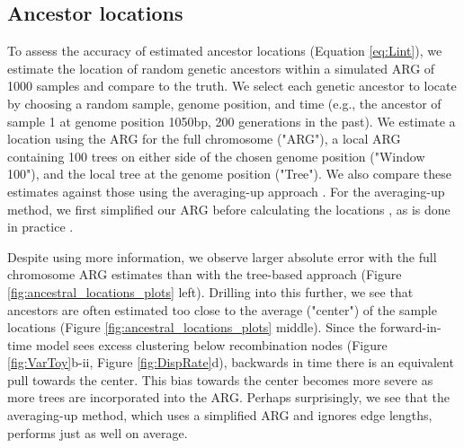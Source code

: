  

\subsection{Ancestor locations}

To assess the accuracy of estimated ancestor locations (Equation \ref{eq:Lint}), we estimate the location of random genetic ancestors within a simulated ARG of 1000 samples and compare to the truth. We select each genetic ancestor to locate by choosing a random sample, genome position, and time (e.g., the ancestor of sample 1 at genome position 1050bp, 200 generations in the past). We estimate a location using the ARG for the full chromosome ("ARG"), a local ARG containing 100 trees on either side of the chosen genome position ("Window 100"), and the local tree at the genome position ("Tree"). We also compare these estimates against those using the averaging-up approach \citep{Wohns2022}. For the averaging-up method, we first simplified our ARG before calculating the locations \citep{Kelleher2018, Wong2023}, as is done in practice \citep{Wohns2022}.

Despite using more information, we observe larger absolute error with the full chromosome ARG estimates than with the tree-based approach (Figure \ref{fig:ancestral_locations_plots} left). Drilling into this further, we see that ancestors are often estimated too close to the average ("center") of the sample locations (Figure \ref{fig:ancestral_locations_plots} middle). Since the forward-in-time model sees excess clustering below recombination nodes (Figure \ref{fig:VarToy}b-ii, Figure \ref{fig:DispRate}d), backwards in time there is an equivalent pull towards the center. This bias towards the center becomes more severe as more trees are incorporated into the ARG.  
Perhaps surprisingly, we see that the averaging-up method, which uses a simplified ARG and ignores edge lengths, performs just as well on average. 

